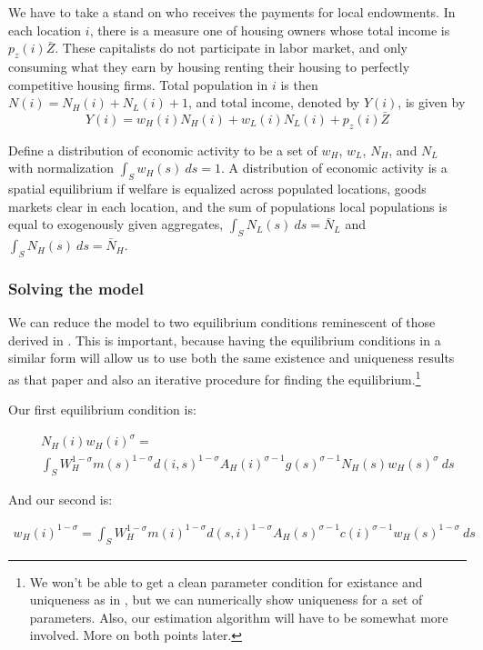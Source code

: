 \documentclass{article}
\begin{document}
We have to take a stand on who receives the payments for local endowments. In each location $i$, there is a measure one of housing owners whose total income is $p_z(i) \bar{Z}$.  These capitalists do not participate in labor market, and only consuming what they earn by housing renting their housing to perfectly competitive housing firms.  Total population in $i$ is then $N(i)=N_H(i)+N_L(i)+1$, and total income, denoted by $Y(i)$, is given by
\[
	Y(i) = w_H(i) N_H(i) + w_L(i) N_L(i) + p_z(i) \bar{Z}
\]

Define a distribution of economic activity to be a set of $w_H$, $w_L$, $N_H$, and $N_L$ with normalization $\int_S w_H(s)~ ds =1$. A distribution of economic activity is a spatial equilibrium if welfare is equalized across populated locations, goods markets clear in each location, and the sum of populations local populations is equal to exogenously given aggregates, $\int_S N_L(s) ~ds = \bar{N}_L$ and $\int_S N_H(s) ~ds = \bar{N}_H$.

\subsubsection{Solving the model}

We can reduce the model to two equilibrium conditions reminescent of those derived in \citet{allen2014trade}.  This is important, because having the equilibrium conditions in a similar form will allow us to use both the same existence and uniqueness results as that paper and also an iterative procedure for finding the equilibrium.\footnote{We won't be able to get a clean parameter condition for existance and uniqueness as in \citet{allen2014trade}, but we can numerically show uniqueness for a set of parameters.  Also, our estimation algorithm will have to be somewhat more involved.  More on both points later.}

Our first equilibrium condition is:

\begin{eqnarray}
	& & N_H(i) w_H(i)^{\sigma}   = \nonumber \\
	& & \int_S W_H^{1-\sigma} m(s)^{1-\sigma} d(i,s)^{1-\sigma} A_H(i)^{\sigma-1} g(s)^{\sigma-1} N_H(s) w_H(s)^{\sigma}~ds  \nonumber
    \label{eq:equib1}
\end{eqnarray}

And our second is:

\begin{eqnarray}
 	w_H(i)^{1-\sigma} = \int_S W_H^{1-\sigma} m(i)^{1-\sigma} d(s,i)^{1-\sigma} A_H(s)^{\sigma-1} c(i)^{\sigma-1}  	w_H(s)^{1-\sigma} \nonumber
 	~ ds
    \label{eq:equib2}
\end{eqnarray}
\end{document}
